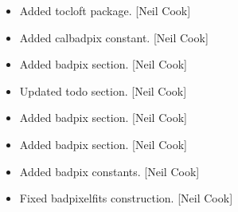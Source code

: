 \documentclass[a4paper,10pt,english]{report}
\begin{document}
\begin{itemize}
\item {} 
Added tocloft package. {[}Neil Cook{]}

\item {} 
Added calbadpix constant. {[}Neil Cook{]}

\item {} 
Added badpix section. {[}Neil Cook{]}

\item {} 
Updated todo section. {[}Neil Cook{]}

\item {} 
Added badpix section. {[}Neil Cook{]}

\item {} 
Added badpix section. {[}Neil Cook{]}

\item {} 
Added badpix constants. {[}Neil Cook{]}

\item {} 
Fixed badpixelfits construction. {[}Neil Cook{]}

\end{itemize}
\end{document}
